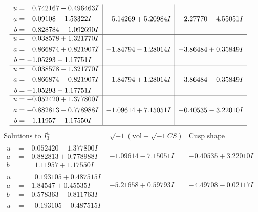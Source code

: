\documentclass[1p]{elsarticle_modified}
\theoremstyle{definition}
\newcommand{\I}{\sqrt{-1}}
\begin{document}
$$\begin{array}{c|c|c}
\begin{aligned}
u &= \phantom{-}0.742167 - 0.496463 I \\
a &= -0.09108 - 1.53322 I \\
b &= -0.828784 - 1.092690 I\end{aligned}
 & -5.14269 + 5.20984 I & -2.27770 - 4.55051 I \\ \hline\begin{aligned}
u &= \phantom{-}0.038578 + 1.321770 I \\
a &= \phantom{-}0.866874 + 0.821907 I \\
b &= -1.05293 + 1.17751 I\end{aligned}
 & -1.84794 - 1.28014 I & -3.86484 + 0.35849 I \\ \hline\begin{aligned}
u &= \phantom{-}0.038578 - 1.321770 I \\
a &= \phantom{-}0.866874 - 0.821907 I \\
b &= -1.05293 - 1.17751 I\end{aligned}
 & -1.84794 + 1.28014 I & -3.86484 - 0.35849 I \\ \hline\begin{aligned}
u &= -0.052420 + 1.377800 I \\
a &= -0.882813 - 0.778988 I \\
b &= \phantom{-}1.11957 - 1.17550 I\end{aligned}
 & -1.09614 + 7.15051 I & -0.40535 - 3.22010 I\\
 \hline 
 \end{array}$$\newpage$$\begin{array}{c|c|c}  
\text{Solutions to }I^u_{3}& \I (\text{vol} + \sqrt{-1}CS) & \text{Cusp shape}\\
 \hline 
\begin{aligned}
u &= -0.052420 - 1.377800 I \\
a &= -0.882813 + 0.778988 I \\
b &= \phantom{-}1.11957 + 1.17550 I\end{aligned}
 & -1.09614 - 7.15051 I & -0.40535 + 3.22010 I \\ \hline\begin{aligned}
u &= \phantom{-}0.193105 + 0.487515 I \\
a &= -1.84547 + 0.45535 I \\
b &= -0.578363 - 0.811763 I\end{aligned}
 & -5.21658 + 0.59793 I & -4.49708 - 0.02117 I \\ \hline\begin{aligned}
u &= \phantom{-}0.193105 - 0.487515 I \\

\end{aligned}
\end{array}$$
\end{document}
